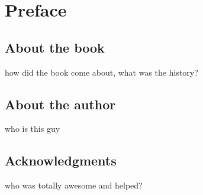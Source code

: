 \chapter*{Preface}

\section*{About the book}
how did the book come about, what was the history?

\section*{About the author}
who is this guy

\section*{Acknowledgments}
who was totally awesome and helped?
